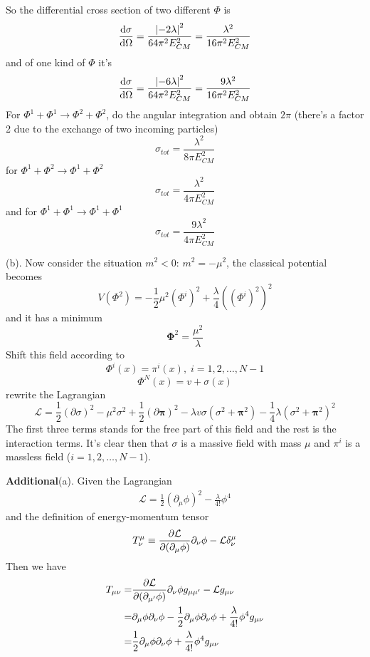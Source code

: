 \documentclass{article}
\newcommand{\lag}{\mathcal{L}}
\newcommand{\bm}[1]{\boldsymbol{#1}}
\newcommand{\s}{\sigma}
\begin{document}
So the differential cross section of two different $\Phi$ is
$$ \dv{\s}{\Omega}=\frac{\abs{-2\lambda}^2}{64\pi^2E_{CM}^2}=\frac{\lambda^2}{16\pi^2E_{CM}^2}$$
and of one kind of $\Phi$ it's
$$ \dv{\s}{\Omega}=\frac{\abs{-6\lambda}^2}{64\pi^2E_{CM}^2}=\frac{9\lambda^2}{16\pi^2E_{CM}^2}$$
For $\Phi^1+\Phi^1\rightarrow\Phi^2+\Phi^2$, do the angular integration and obtain $2\pi$ (there's a factor 2 due to the exchange of two incoming particles)
$$\s_{tot} =\frac{\lambda^2}{8\pi E_{CM}^2}$$
for $\Phi^1+\Phi^2\rightarrow\Phi^1+\Phi^2$
$$\s_{tot} = \frac{\lambda^2}{4\pi E_{CM}^2}$$
and for $\Phi^1+\Phi^1\rightarrow\Phi^1+\Phi^1$
$$\s_{tot} = \frac{9\lambda^2}{4\pi E_{CM}^2}$$

(b). Now consider the situation $m^2<0$: $m^2=-\mu^2$, the classical potential becomes
$$V(\Phi^2)=-\frac{1}{2}\mu^2(\Phi^i)^2+\frac{\lambda}{4}((\Phi^i)^2)^2$$
and it has a minimum
$$\boldsymbol{\Phi}^2=\frac{\mu^2}{\lambda}$$
Shift this field according to
$$\Phi^i(x)=\pi^i(x),\;i=1,2,\dots,N-1$$
$$\Phi^N(x)=v+\s(x)$$
rewrite the Lagrangian
$$\lag=\frac{1}{2}(\partial\s)^2-\mu^2\s^2+\frac{1}{2}(\partial\bm{\pi})^2-\lambda v\s(\s^2+\bm{\pi}^2)-\frac{1}{4}\lambda(\s^2+\bm{\pi}^2)^2$$
The first three terms stands for the free part of this field and the rest is the interaction terms. It's clear then that $\sigma$ is a massive field with mass $\mu$ and $\pi^i$ is a massless field ($i=1,2,\dots,N-1$).





{\bf Additional}\quad(a). Given the Lagrangian
\begin{align}
  \mathcal{L}=\frac{1}{2}(\partial_{\mu}\phi)^2-\frac{\lambda}{4!}\phi^4
\end{align}
and the definition of energy-momentum tensor
\begin{align}
  T^{\mu}_{\nu}\equiv\pdv{\mathcal{L}}{(\partial_{\mu}\phi)}\partial_{\nu}\phi-\mathcal{L}\delta^{\mu}_{\nu}
\end{align}
Then we have
\begin{align*}
  T_{\mu\nu}=&\pdv{\mathcal{L}}{(\partial_{\mu'}\phi)}\partial_{\nu}\phi g_{\mu\mu'}-\mathcal{L}g_{\mu\nu}\\
  =&\partial_{\mu}\phi\partial_{\nu}\phi-\frac{1}{2}\partial_{\mu}\phi\partial_{\nu}\phi+\frac{\lambda}{4!}\phi^4g_{\mu\nu}\\
  =&\frac{1}{2}\partial_{\mu}\phi\partial_{\nu}\phi+\frac{\lambda}{4!}\phi^4g_{\mu\nu}
\end{align*}
\end{document}
